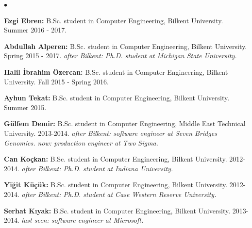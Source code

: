 \documentclass[margin,line]{res}
\newenvironment{list2}{
  \begin{list}{$\bullet$}{%
      \setlength{\itemsep}{0.1cm}
      \setlength{\parsep}{0in} \setlength{\parskip}{0in}
      \setlength{\topsep}{0in} \setlength{\partopsep}{0in} 
      \setlength{\leftmargin}{0.2in}}}{\end{list}}
\begin{document}
\begin{resume}
\begin{list2}
\item {\bf Ezgi Ebren:} B.Sc. student in Computer Engineering,  Bilkent University. Summer 2016 - 2017.
\item {\bf Abdullah Alperen:} B.Sc. student in Computer Engineering,  Bilkent University. Spring 2015 - 2017. {\it after Bilkent: Ph.D. student at Michigan State University.}
\item {\bf Halil İbrahim Özercan:} B.Sc. student in Computer Engineering,  Bilkent University. Fall 2015 - Spring 2016. 
\item {\bf Ayhun Tekat:} B.Sc. student in Computer Engineering,  Bilkent University. Summer 2015. 

\item {\bf Gülfem Demir:} B.Sc. student in Computer Engineering,  Middle East Technical University. 2013-2014. {\it after Bilkent: software engineer at Seven Bridges Genomics. now: production engineer at Two Sigma.}

\item {\bf Can Koçkan:} B.Sc. student in Computer Engineering,  Bilkent University.  2012-2014. {\it after Bilkent: Ph.D. student at Indiana University.}
\item {\bf Yiğit Küçük:} B.Sc. student in Computer Engineering,  Bilkent University. 2012-2014. {\it after Bilkent: Ph.D. student at Case Western Reserve University.}
\item {\bf Serhat Kıyak:} B.Sc. student in Computer Engineering,  Bilkent University. 2013-2014. {\it last seen: software engineer at Microsoft.}
\end{list2}


\vspace*{-.4cm}

\end{resume}
\end{document}
